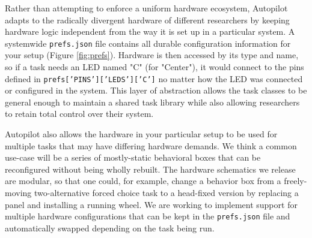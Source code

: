 Rather than attempting to enforce a uniform hardware ecosystem, Autopilot adapts to the radically divergent hardware of different researchers by keeping hardware logic independent from the way it is set up in a particular system. A systemwide \texttt{prefs.json} file contains all durable configuration information for your setup (Figure \ref{fig:prefs}). Hardware is then accessed by its type and name, so if a task needs an LED named "C" (for "Center"), it would connect to the pins defined in  \texttt{prefs['PINS']['LEDS']['C']} no matter how the LED was connected or configured in the system. This layer of abstraction allows the task classes to be general enough to maintain a shared task library while also allowing researchers to retain total control over their system. 
 
Autopilot also allows the hardware in your particular setup to be used for multiple tasks that may have differing hardware demands. We think a common use-case will be a series of mostly-static behavioral boxes that can be reconfigured without being wholly rebuilt. The hardware schematics we release are modular, so that one could, for example, change a behavior box from a freely-moving two-alternative forced choice task to a head-fixed version by replacing a panel and installing a running wheel. We are working to implement support for multiple hardware configurations that can be kept in the \texttt{prefs.json} file and automatically swapped depending on the task being run.